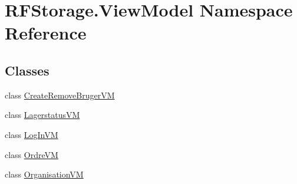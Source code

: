 \hypertarget{namespace_r_f_storage_1_1_view_model}{}\section{R\+F\+Storage.\+View\+Model Namespace Reference}
\label{namespace_r_f_storage_1_1_view_model}
\subsection*{Classes}
\begin{DoxyCompactItemize}
\item 
class \mbox{\hyperlink{class_r_f_storage_1_1_view_model_1_1_create_remove_bruger_v_m}{Create\+Remove\+Bruger\+VM}}
\item 
class \mbox{\hyperlink{class_r_f_storage_1_1_view_model_1_1_lagerstatus_v_m}{Lagerstatus\+VM}}
\item 
class \mbox{\hyperlink{class_r_f_storage_1_1_view_model_1_1_log_in_v_m}{Log\+In\+VM}}
\item 
class \mbox{\hyperlink{class_r_f_storage_1_1_view_model_1_1_ordre_v_m}{Ordre\+VM}}
\item 
class \mbox{\hyperlink{class_r_f_storage_1_1_view_model_1_1_organisation_v_m}{Organisation\+VM}}
\end{DoxyCompactItemize}
